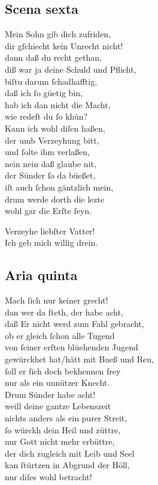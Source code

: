 \documentclass{ees}
\newenvironment{lyrics}[1]{%
  \subsection{#1}\nopagebreak%
  \begin{lyricslist}%
  \let\voice\item%
}{%
  \end{lyricslist}%
}
\newcommand\voiceGehorsame{\voice[Geh. Sohn]}
\newcommand\voiceVater{\voice[Vatter]}
\begin{document}
\begin{lyrics}{Scena sexta}
  \voiceVater
  Mein Sohn gib dich zufriden,\\
  dir gſchiecht kein Unrecht nicht!\\
  dann daß du recht gethan,\\
  diß war ja deine Schuld und Pflicht,\\
  biſtu darum ſchadhafftig,\\
  daß ich ſo güetig bin,\\
  hab ich dan nicht die Macht,\\
  wie redeſt du ſo khün?\\
  Kann ich wohl diſen haßen,\\
  der umb Verzeyhung bitt,\\
  und ſolte ihm verlaßen,\\
  nein nein daß glaube nit,\\
  der Sünder ſo da büeßet,\\
  iſt auch ſchon gäntzlich mein,\\
  drum werde dorth die lezte\\
  wohl gar die Erſte ſeyn.

  \voiceGehorsame
  Verzeyhe liebſter Vatter!\\
  Ich geb mich willig drein.
\end{lyrics}

\begin{lyrics}{Aria quinta}
  \voiceGehorsame
  Mach ſich nur keiner grecht!\\
  dan wer da ſteth, der habe acht,\\
  daß Er nicht werd zum Fahl gebracht,\\
  ob er gleich ſchon alle Tugend\\
  von ſeiner erſten blüehenden Jugend\\
  gewürckhet hat/hätt mit Bueß und Reu,\\
  ſoll er ſich doch bekhennen frey\\
  nur als ein unnützer Knecht.\\[1ex]
  Drum Sünder habe acht!\\
  weill deine gantze Lebenszeit\\
  nichts anders als ein purer Streit,\\
  ſo würckh dein Heil und züttre,\\
  nur Gott nicht mehr erbüttre,\\
  der dich zugleich mit Leib und Seel\\
  kan ſtürtzen in Abgrund der Höll,\\
  nur diſes wohl betracht!
\end{lyrics}
\end{document}
